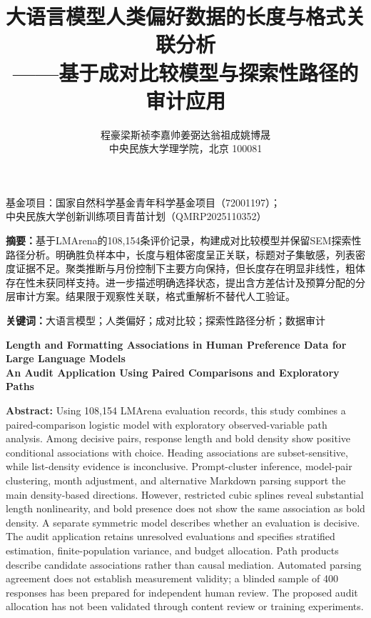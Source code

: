 \documentclass[UTF8,11pt,a4paper,fontset=windows]{ctexart}
\title{\heiti 大语言模型人类偏好数据的长度与格式关联分析\\[0.3em]
\large ——基于成对比较模型与探索性路径的审计应用}
\author{程豪\quad 梁斯祯\quad 李嘉帅\quad 姜弼达\quad 翁祖成\quad 姚博晟\\
\small 中央民族大学理学院，北京 100081}
\date{}
\numberwithin{equation}{section}
\begin{document}
\maketitle
\thispagestyle{plain}
\begin{center}\small
基金项目：国家自然科学基金青年科学基金项目（72001197）；\\
中央民族大学创新训练项目青苗计划（QMRP2025110352）
\end{center}

\noindent\textbf{摘要：}基于LMArena的108,154条评价记录，构建成对比较模型并保留SEM探索性路径分析。明确胜负样本中，长度与粗体密度呈正关联，标题对子集敏感，列表密度证据不足。聚类推断与月份控制下主要方向保持，但长度存在明显非线性，粗体存在性未获同样支持。进一步描述明确选择状态，提出含方差估计及预算分配的分层审计方案。结果限于观察性关联，格式重解析不替代人工验证。

\noindent\textbf{关键词：}大语言模型；人类偏好；成对比较；探索性路径分析；数据审计

\begin{center}
\large\bfseries Length and Formatting Associations in Human Preference Data for Large Language Models\\[0.3em]
\normalsize An Audit Application Using Paired Comparisons and Exploratory Paths
\end{center}
\noindent\textbf{Abstract:} Using 108,154 LMArena evaluation records, this study combines a paired-comparison logistic model with exploratory observed-variable path analysis. Among decisive pairs, response length and bold density show positive conditional associations with choice. Heading associations are subset-sensitive, while list-density evidence is inconclusive. Prompt-cluster inference, model-pair clustering, month adjustment, and alternative Markdown parsing support the main density-based directions. However, restricted cubic splines reveal substantial length nonlinearity, and bold presence does not show the same association as bold density. A separate symmetric model describes whether an evaluation is decisive. The audit application retains unresolved evaluations and specifies stratified estimation, finite-population variance, and budget allocation. Path products describe candidate associations rather than causal mediation. Automated parsing agreement does not establish measurement validity; a blinded sample of 400 responses has been prepared for independent human review. The proposed audit allocation has not been validated through content review or training experiments.
\end{document}
